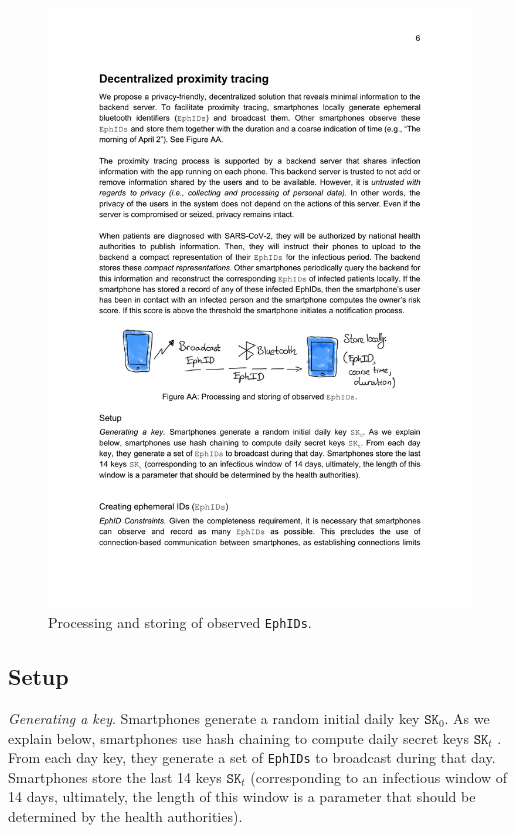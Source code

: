 \documentclass[12pt,a4paper]{article}
\begin{document}
\begin{figure}[H]
\centering
\includegraphics[scale=0.6]{fig/AA}
\caption{Processing and storing of observed \texttt{EphIDs}.}
\label{AA}
\end{figure}
\subsection*{Setup}
\textit{Generating a key}. Smartphones generate a random initial daily key $\texttt{SK}_0$. As we explain below, smartphones use hash chaining to compute daily secret keys $\texttt{SK}_t$ . From each day key, they generate a set of \texttt{EphIDs} to broadcast during that day. Smartphones store the last 14 keys $\texttt{SK}_t$ (corresponding to an infectious window of 14 days, ultimately, the length of this window is a parameter that should be determined by the health authorities).
\end{document}
